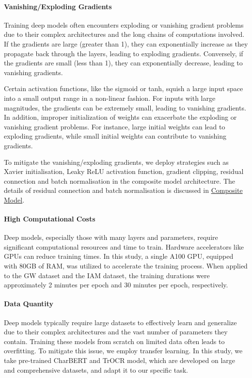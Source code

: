\paragraph*{Vanishing/Exploding Gradients}
\label{par:3_vanishing_exploding_gradients}
Training deep models often encounters exploding or vanishing gradient problems due to their complex architectures and the long chains of computations involved. If the gradients are large (greater than 1), they can exponentially increase as they propagate back through the layers, leading to exploding gradients. Conversely, if the gradients are small (less than 1), they can exponentially decrease, leading to vanishing gradients. 

Certain activation functions, like the sigmoid or tanh, squish a large input space into a small output range in a non-linear fashion. For inputs with large magnitudes, the gradients can be extremely small, leading to vanishing gradients. In addition, improper initialization of weights can exacerbate the exploding or vanishing gradient problems. For instance, large initial weights can lead to exploding gradients, while small initial weights can contribute to vanishing gradients.

To mitigate the vanishing/exploding gradients, we deploy strategies such as Xavier initialisation, Leaky ReLU activation function, gradient clipping, residual connection and batch normalisation in the composite model architecture. The details of residual connection and batch normalisation is discussed in \hyperref[subsec:3_composite_model]{Composite Model}.

\paragraph*{High Computational Costs}
\label{par:3_high_computational_costs}
Deep models, especially those with many layers and parameters, require significant computational resources and time to train. Hardware accelerators like GPUs can reduce training times. In this study, a single A100 GPU, equipped with 80GB of RAM, was utilized to accelerate the training process. When applied to the GW dataset and the IAM dataset, the training durations were approximately 2 minutes per epoch and 30 minutes per epoch, respectively.

\paragraph*{Data Quantity}
\label{par:3_data_quantity}
Deep models typically require large datasets to effectively learn and generalize due to their complex architectures and the vast number of parameters they contain. Training these models from scratch on limited data often leads to overfitting. To mitigate this issue, we employ transfer learning. In this study, we take pre-trained CharBERT and TrOCR model, which are developed on large and comprehensive datasets, and adapt it to our specific task. 

